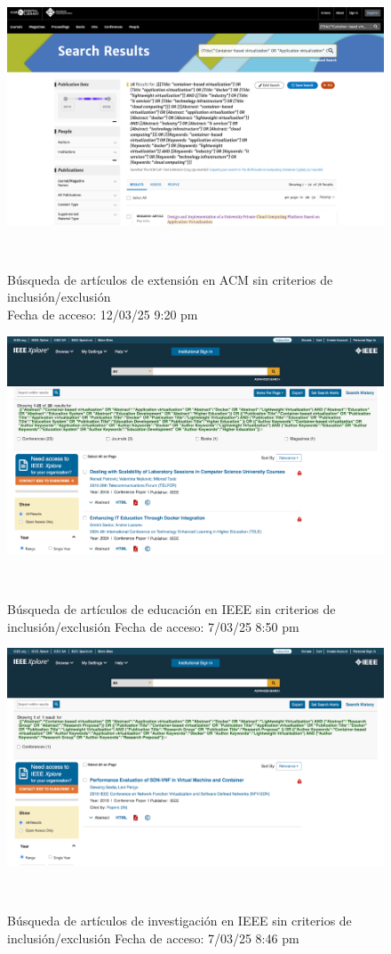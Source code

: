 \FloatBarrier\begin{figure}[H]
    \centering
    \includegraphics[width=\textwidth,keepaspectratio]{apendices/BD/sin-criterios/ACM-ind.png}
    \caption{Búsqueda de artículos de extensión en ACM sin criterios de inclusión/exclusión \\
    Fecha de acceso: 12/03/25 9:20 pm
    }\
\end{figure}
\FloatBarrier\begin{figure}[H]
    \centering
    \includegraphics[width=\textwidth,keepaspectratio]{apendices/BD/sin-criterios/IEEE-ed.png}
    \caption{Búsqueda de artículos de educación en IEEE sin criterios de inclusión/exclusión
    Fecha de acceso: 7/03/25 8:50 pm
    }\
\end{figure}
\FloatBarrier\begin{figure}[H]
    \centering
    \includegraphics[width=\textwidth,keepaspectratio]{apendices/BD/sin-criterios/IEEE-inv.png}
    \caption{Búsqueda de artículos de investigación en IEEE sin criterios de inclusión/exclusión
    Fecha de acceso: 7/03/25 8:46 pm
    }\
\end{figure}

